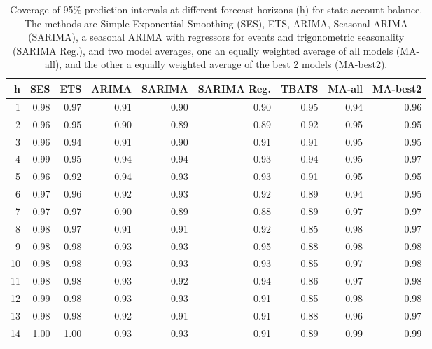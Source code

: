 \begin{table}[ht]
\centering
\begin{tabular}{rrrrrrrrr}
  \hline
h & SES & ETS & ARIMA & SARIMA & SARIMA Reg. & TBATS & MA-all & MA-best2 \\ 
  \hline
1 & 0.98 & 0.97 & 0.91 & 0.90 & 0.90 & 0.95 & 0.94 & 0.96 \\ 
  2 & 0.96 & 0.95 & 0.90 & 0.89 & 0.89 & 0.92 & 0.95 & 0.95 \\ 
  3 & 0.96 & 0.94 & 0.91 & 0.90 & 0.91 & 0.91 & 0.95 & 0.95 \\ 
  4 & 0.99 & 0.95 & 0.94 & 0.94 & 0.93 & 0.94 & 0.95 & 0.97 \\ 
  5 & 0.96 & 0.92 & 0.94 & 0.93 & 0.93 & 0.91 & 0.95 & 0.95 \\ 
  6 & 0.97 & 0.96 & 0.92 & 0.93 & 0.92 & 0.89 & 0.94 & 0.95 \\ 
  7 & 0.97 & 0.97 & 0.90 & 0.89 & 0.88 & 0.89 & 0.97 & 0.97 \\ 
  8 & 0.98 & 0.97 & 0.91 & 0.91 & 0.92 & 0.85 & 0.98 & 0.97 \\ 
  9 & 0.98 & 0.98 & 0.93 & 0.93 & 0.95 & 0.88 & 0.98 & 0.98 \\ 
  10 & 0.98 & 0.98 & 0.93 & 0.93 & 0.93 & 0.85 & 0.97 & 0.98 \\ 
  11 & 0.98 & 0.98 & 0.93 & 0.92 & 0.94 & 0.86 & 0.97 & 0.98 \\ 
  12 & 0.99 & 0.98 & 0.93 & 0.93 & 0.91 & 0.85 & 0.98 & 0.98 \\ 
  13 & 0.98 & 0.98 & 0.92 & 0.91 & 0.91 & 0.88 & 0.96 & 0.97 \\ 
  14 & 1.00 & 1.00 & 0.93 & 0.93 & 0.91 & 0.89 & 0.99 & 0.99 \\ 
   \hline
\end{tabular}
\caption{Coverage of 95\% prediction intervals at different forecast horizons (h) for state account balance. The methods are Simple Exponential Smoothing (SES), ETS, ARIMA, Seasonal ARIMA (SARIMA), a seasonal ARIMA with regressors for events and trigonometric seasonality (SARIMA Reg.), and two model averages, one an equally weighted average of all models (MA-all), and the other a equally weighted average of the best 2 models (MA-best2).} 
\label{tab:covsab}
\end{table}


